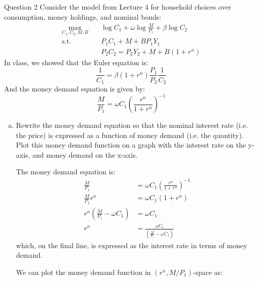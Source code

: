 \documentclass[a4paper]{article}
\begin{document}
	\begin{questionbox}{Question 2}
		Consider the model from Lecture 4 for household choices over consumption, money holdings, and nominal bonds:
		\begin{align*}
			\max_{C_1,C_2,M,B} \quad &\log C_1 + \omega\log \frac{M}{P_1} + \beta\log C_2 \\
			\text{s.t.} \quad &P_1C_1 + M + B P_1Y_1\\
			&P_2C_2 = P_2Y_2 + M + B (1+r^n)
		\end{align*}
		In class, we showed that the Euler equation is:
		\begin{equation}
			\frac{1}{C_1} = \beta(1+r^n)\frac{P_1}{P_2}\frac{1}{C_2} \label{4.1}
		\end{equation}
		And the money demand equation is given by:
		\begin{equation}
			\frac{M}{P_1} = \omega C_1 \left( \frac{r^n}{1 + r^n} \right)^{-1} \label{4.2}
		\end{equation}
		\begin{enumerate}[(a)]
			\item Rewrite the money demand equation so that the nominal interest rate (i.e. the price) is expressed as a function of money demand (i.e. the quantity). Plot this money demand function on a graph with the interest rate on the y-axis, and money demand on the x-axis.
			\begin{explanationbox}
				The money demand equation is:
					\begin{align*}
						\frac{M}{P_1} &= \omega C_1 \left( \frac{r^n}{1 + r^n} \right)^{-1}\\
						\frac{M}{P_1} r^n &= \omega C_1 (1+r^n)\\
						r^n\left( \frac{M}{P_1} - \omega C_1 \right) &= \omega C_1\\
						r^n &= \frac{\omega C_1}{\left( \frac{M}{P_1} - \omega C_1 \right)}
					\end{align*}
					which, on the final line, is expressed as the interest rate in terms of money demand.
			\end{explanationbox}
			\begin{explanationbox}
				We can plot the money demand function in \( (r^n, M/P_1) \)-space as:
				\begin{figure}[H]
					\centering
\end{figure}
\end{explanationbox}
\end{enumerate}
\end{questionbox}
\end{document}
